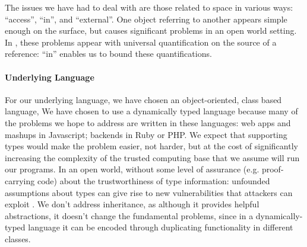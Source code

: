 

The issues we have had to deal with are those related to space in
various ways: ``access'', ``in'', and ``external''.  One object
referring to another appears simple enough on the surface, but causes
significant problems in an open world setting. In \Chainmail, these
problems appear with universal quantification on the source of a
reference: ``in'' enables us to bound these quantifications.



\paragraph{Underlying Language}


For our underlying language, we have chosen an object-oriented, class based language,
%
We have chosen to use a dynamically typed language because many of the
problems we hope to address are written in these
languages: web apps and mashups in Javascript; backends in Ruby or
PHP.  We expect that supporting types would make the problem easier,
not harder, but at the cost of significantly increasing the complexity
of the trusted computing base that we assume will run our programs. In
an open world, without some level of assurance (e.g. proof-carrying
code) about the trustworthiness of type information: unfounded
assumptions about types can give rise to new vulnerabilities that
attackers can exploit \cite{pickles}. We don't address inheritance, as although it provides helpful abstractions, it doesn't change the fundamental problems, since in a dynamically-typed language it can be encoded through duplicating functionality in different classes.

